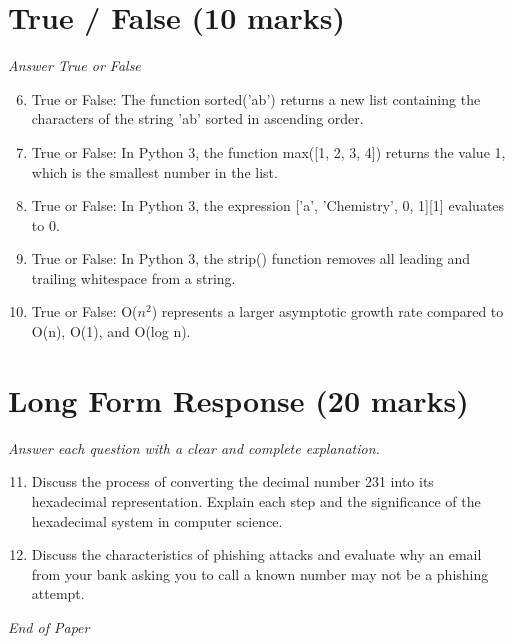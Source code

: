 \documentclass[12pt]{article}
\begin{document}
\section*{True / False (10 marks)}
\textit{Answer True or False}
\begin{enumerate}[label=\arabic*.]
\setcounter{enumi}{5}
\item True or False: The function sorted('ab') returns a new list containing the characters of the string 'ab' sorted in ascending order.
\item True or False: In Python 3, the function max([1, 2, 3, 4]) returns the value 1, which is the smallest number in the list.
\item True or False: In Python 3, the expression ['a', 'Chemistry', 0, 1][1] evaluates to 0.
\item True or False: In Python 3, the strip() function removes all leading and trailing whitespace from a string.
\item True or False: O($n^2$) represents a larger asymptotic growth rate compared to O(n), O(1), and O(log n).
\end{enumerate}

\section*{Long Form Response (20 marks)}
\textit{Answer each question with a clear and complete explanation.}
\begin{enumerate}[label=\arabic*.]
\setcounter{enumi}{10}
\item Discuss the process of converting the decimal number 231 into its hexadecimal representation. Explain each step and the significance of the hexadecimal system in computer science.
\item Discuss the characteristics of phishing attacks and evaluate why an email from your bank asking you to call a known number may not be a phishing attempt.
\end{enumerate}

\vfill
\noindent\textit{End of Paper}
\end{document}
